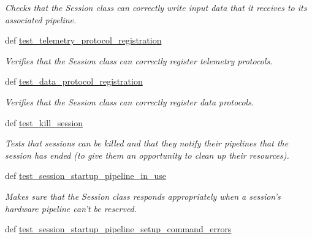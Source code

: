 \begin{DoxyCompactItemize}
\begin{DoxyCompactList}\small\item\em Checks that the Session class can correctly write input data that it receives to its associated pipeline. \end{DoxyCompactList}\item 
def \hyperlink{classhwm_1_1sessions_1_1tests_1_1test__session_1_1_test_session_a381833b5662313a5f1693d87d76eb77e}{test\-\_\-telemetry\-\_\-protocol\-\_\-registration}
\begin{DoxyCompactList}\small\item\em Verifies that the Session class can correctly register telemetry protocols. \end{DoxyCompactList}\item 
def \hyperlink{classhwm_1_1sessions_1_1tests_1_1test__session_1_1_test_session_a93dd8b73edf9d76e4b887e7614d2b7b9}{test\-\_\-data\-\_\-protocol\-\_\-registration}
\begin{DoxyCompactList}\small\item\em Verifies that the Session class can correctly register data protocols. \end{DoxyCompactList}\item 
\hypertarget{classhwm_1_1sessions_1_1tests_1_1test__session_1_1_test_session_a8dc0b41ad1ce126fcc2e22024e908773}{def \hyperlink{classhwm_1_1sessions_1_1tests_1_1test__session_1_1_test_session_a8dc0b41ad1ce126fcc2e22024e908773}{test\-\_\-kill\-\_\-session}}\label{classhwm_1_1sessions_1_1tests_1_1test__session_1_1_test_session_a8dc0b41ad1ce126fcc2e22024e908773}

\begin{DoxyCompactList}\small\item\em Tests that sessions can be killed and that they notify their pipelines that the session has ended (to give them an opportunity to clean up their resources). \end{DoxyCompactList}\item 
\hypertarget{classhwm_1_1sessions_1_1tests_1_1test__session_1_1_test_session_ac037a79f5767312653e0c68eec2cc8a5}{def \hyperlink{classhwm_1_1sessions_1_1tests_1_1test__session_1_1_test_session_ac037a79f5767312653e0c68eec2cc8a5}{test\-\_\-session\-\_\-startup\-\_\-pipeline\-\_\-in\-\_\-use}}\label{classhwm_1_1sessions_1_1tests_1_1test__session_1_1_test_session_ac037a79f5767312653e0c68eec2cc8a5}

\begin{DoxyCompactList}\small\item\em Makes sure that the Session class responds appropriately when a session's hardware pipeline can't be reserved. \end{DoxyCompactList}\item 
\hypertarget{classhwm_1_1sessions_1_1tests_1_1test__session_1_1_test_session_a10799c2bd7d72723b91db6a8e9350157}{def \hyperlink{classhwm_1_1sessions_1_1tests_1_1test__session_1_1_test_session_a10799c2bd7d72723b91db6a8e9350157}{test\-\_\-session\-\_\-startup\-\_\-pipeline\-\_\-setup\-\_\-command\-\_\-errors}}\label{classhwm_1_1sessions_1_1tests_1_1test__session_1_1_test_session_a10799c2bd7d72723b91db6a8e9350157}


\end{DoxyCompactItemize}
